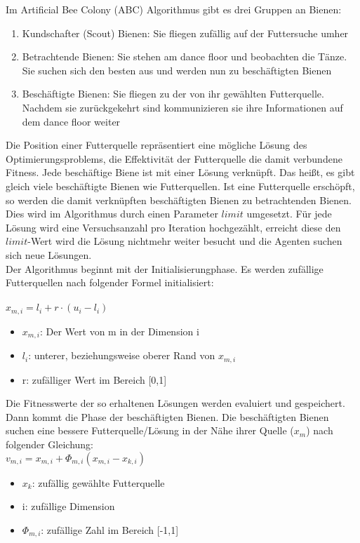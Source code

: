 Im Artificial Bee Colony (ABC) Algorithmus gibt es drei Gruppen an Bienen:
\begin{enumerate}
  \item Kundschafter (Scout) Bienen: Sie fliegen zufällig auf der Futtersuche umher
  \item Betrachtende Bienen: Sie stehen am dance floor und beobachten die Tänze. Sie suchen sich den besten aus und werden nun zu beschäftigten Bienen
  \item Beschäftigte Bienen: Sie fliegen zu der von ihr gewählten Futterquelle. Nachdem sie zurückgekehrt sind kommunizieren sie ihre Informationen auf dem dance floor weiter
\end{enumerate} 
Die Position einer Futterquelle repräsentiert eine mögliche Lösung des Optimierungsproblems, die Effektivität der Futterquelle die damit verbundene Fitness.
Jede beschäftige Biene ist mit einer Lösung verknüpft. Das heißt, es gibt gleich viele beschäftigte Bienen wie Futterquellen.\cite{ pham2005bees} Ist eine Futterquelle erschöpft, so werden die damit verknüpften beschäftigten Bienen zu betrachtenden Bienen. Dies wird im Algorithmus durch einen Parameter $limit$ umgesetzt. Für jede Lösung wird eine Versuchsanzahl pro Iteration hochgezählt, erreicht diese den $limit$-Wert wird die Lösung nichtmehr weiter besucht und die Agenten suchen sich neue Lösungen.
 \\
Der Algorithmus beginnt mit der Initialisierungphase. Es werden zufällige Futterquellen nach folgender Formel initialisiert: \\\\
$x_{m,i}=l_i+r \cdot (u_i-l_i)$
\begin{itemize}
  \item $x_{m,i}$: Der Wert von m in der Dimension i
  \item $l_i$: unterer, beziehungsweise oberer Rand von $x_{m,i}$
  \item r: zufälliger Wert im Bereich [0,1]
\end{itemize}

Die Fitnesswerte der so erhaltenen Lösungen werden evaluiert und gespeichert.\\
Dann kommt die Phase der beschäftigten Bienen.
Die beschäftigten Bienen suchen eine bessere Futterquelle/Lösung in der Nähe ihrer Quelle ($x_m$) nach folgender Gleichung: \\
$v_{m,i}= x_{m,i}+\Phi _{m,i}( x_{m,i}- x_{k,i})$
\begin{itemize}
  \item $x_k$: zufällig gewählte Futterquelle
  \item i: zufällige Dimension
  \item $\Phi _{m,i}$: zufällige Zahl im Bereich [-1,1]
\end{itemize}

